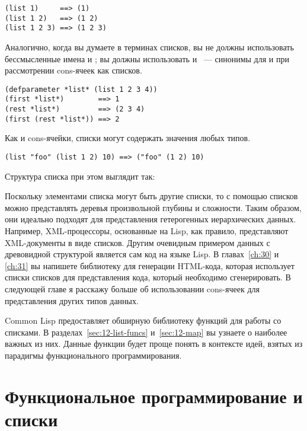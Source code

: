 \begin{lstlisting}
(list 1)     ==> (1)
(list 1 2)   ==> (1 2)
(list 1 2 3) ==> (1 2 3)
\end{lstlisting}

Аналогично, когда вы думаете в терминах списков, вы не должны использовать бессмысленные
имена  и ; вы должны использовать  и ~---
синонимы для  и  при рассмотрении cons-ячеек как списков.

\begin{lstlisting}
(defparameter *list* (list 1 2 3 4))
(first *list*)        ==> 1
(rest *list*)         ==> (2 3 4)
(first (rest *list*)) ==> 2
\end{lstlisting}

Как и cons-ячейки, списки могут содержать значения любых типов.

\begin{lstlisting}
(list "foo" (list 1 2) 10) ==> ("foo" (1 2) 10)
\end{lstlisting}

Структура списка при этом выглядит так:


Поскольку элементами списка могут быть другие списки, то с помощью списков можно представлять
деревья произвольной глубины и сложности. Таким образом, они идеально подходят для
представления гетерогенных иерархических данных. Например, XML-процессоры, основанные на
Lisp, как правило, представляют XML-документы в виде списков. Другим очевидным примером
данных с древовидной структурой является сам код на языке Lisp. В главах~\ref{ch:30} и
\ref{ch:31} вы
напишете библиотеку для генерации HTML-кода, которая использует списки списков для
представления кода, который необходимо сгенерировать. В следующей главе я расскажу больше
об использовании cons-ячеек для представления других типов данных.

Common Lisp предоставляет обширную библиотеку функций для работы со списками. В
разделах~\ref{sec:12-list-funcs} и~\ref{sec:12-map} вы узнаете о наиболее важных из
них. Данные функции будет проще понять в контексте идей, взятых из парадигмы
функционального программирования.

\section{Функциональное программирование и списки}

